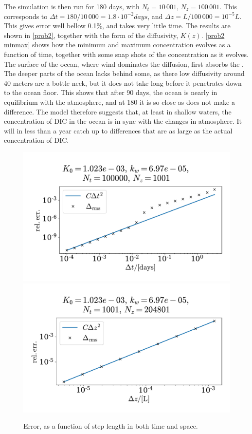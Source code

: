 \documentclass{article}
\begin{document}
    The simulation is then run for 180 days, with $N_t = 10\,001, \, N_z = 100\,001$.
    This corresponds to $\Delta t = 180 / 10\,000 = 1.8 \cdot 10^{-2} \si{days}$, and $\Delta z = L/100\,000 = 10^{-5} L$.
    This gives error well bellow 0.1\%, and takes very little time.
    The results are shown in \autoref{prob2}, together with the form of the diffusivity, $K(z)$.
    \autoref{prob2 minmax} shows how the minimum and maximum concentration evolves as a function of time, together with some snap shots of the concentration as it evolves.
    The surface of the ocean, where wind dominates the diffusion, first absorbs the .
    The deeper parts of the ocean lacks behind some, as there low diffusivity around 40 meters are a bottle neck, but it does not take long before it penetrates down to the ocean floor.
    This shows that after 90 days, the ocean is nearly in equilibrium with the atmosphere, and at 180 it is so close as does not make a difference.
    The model therefore suggests that, at least in shallow waters, the concentration of DIC in the ocean is in sync with the changes in atmosphere.
    It will in less than a year catch up to differences that are as large as the actual concentration of DIC.

    \begin{figure}[H]
        \centering
        \includegraphics[width=.49\textwidth]{../plots/prob2_conv_test_t}
        \includegraphics[width=.49\textwidth]{../plots/prob2_conv_test_z}
        \caption{Error, as a function of step length in both time and space.}
        \label{prob2 conv}
    \end{figure}
\end{document}
